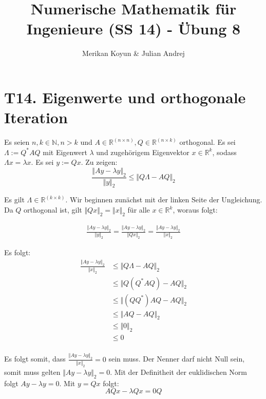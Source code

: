 \documentclass[11pt]{article}
\theoremstyle{plain}
\theoremstyle{definition}
\renewcommand{\a}{\"{a}}
\renewcommand{\o}{\"{o}}
\renewcommand{\u}{\"{u}}
\newcommand{\nat}{\mathbb{N}}
\newcommand{\real}{\mathbb{R}}
\newcommand{\reall}[2]{\mathbb{R}^{(#1 \times #2)}}
\begin{document}
\title{Numerische Mathematik f\u r Ingenieure (SS 14) - \"{U}bung 8}
\author{Merikan Koyun \& Julian Andrej}
\maketitle

\section*{T14. Eigenwerte und orthogonale Iteration}
Es seien $n, k \in \nat, n>k$ und $A \in \reall{n}{n}, Q \in \reall{n}{k}$ orthogonal. Es sei $\Lambda := Q^*AQ$ mit Eigenwert $\lambda$ und zugeh\o rigem Eigenvektor $x \in \real^k$, sodass $\Lambda x = \lambda x$. Es sei $y:=Qx$.
Zu zeigen:
\begin{equation}
\frac{\Vert Ay-\lambda y\Vert_2}{\Vert y \Vert_2} \leq \Vert Q\Lambda - AQ \Vert_2
\end{equation}

Es gilt $\Lambda \in \reall{k}{k}$. Wir beginnen zun\a chst mit der linken Seite der Ungleichung. Da $Q$ orthogonal ist, gilt $\Vert Qx \Vert_2 = \Vert x \Vert_2$ f\u r alle $x \in \real^k$, woraus folgt:

\begin{align*}
\frac{\Vert Ay-\lambda y\Vert_2}{\Vert y \Vert_2} = \frac{\Vert Ay-\lambda y\Vert_2}{\Vert Qx \Vert_2} = \frac{\Vert Ay-\lambda y\Vert_2}{\Vert x \Vert_2}
\end{align*}

Es folgt:
\begin{align*}
\frac{\Vert Ay-\lambda y\Vert_2}{\Vert x \Vert_2} &\leq \Vert Q\Lambda - AQ \Vert_2 \\
&\leq \Vert Q (Q^*AQ)-AQ \Vert_2 \\ 
&\leq \Vert (Q Q^*)AQ-AQ \Vert_2 \\
&\leq \Vert AQ-AQ \Vert_2 \\
&\leq \Vert 0 \Vert_2 \\
&\leq 0 \\
\end{align*}

Es folgt somit, dass $\frac{\Vert Ay-\lambda y\Vert_2}{\Vert x \Vert_2} = 0$ sein muss. Der Nenner darf nicht Null sein, somit muss gelten $\Vert Ay-\lambda y\Vert_2 = 0$. Mit der Definitheit der euklidischen Norm folgt $ Ay-\lambda y = 0$. Mit $y=Qx$ folgt:
\begin{equation}
AQx-\lambda Qx=0Q
\end{equation}
\end{document}
